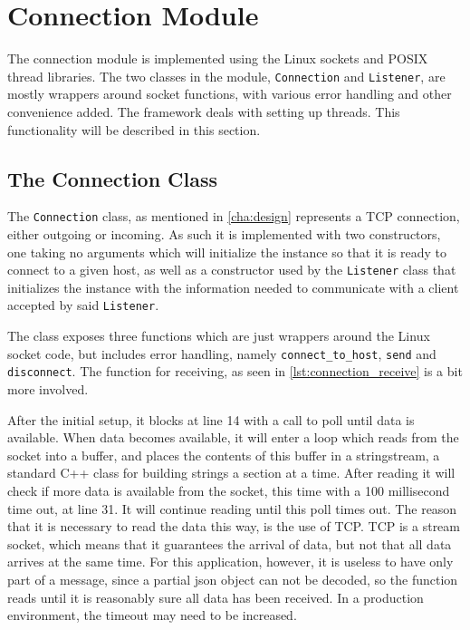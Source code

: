\section{Connection Module}

The connection module is implemented using the Linux sockets and POSIX thread libraries. The two classes in the module, \lstinline|Connection| and \lstinline|Listener|, are mostly wrappers around socket functions,
with various error handling and other convenience added. The framework deals with setting up threads. This functionality will be described in this section.

\subsection{The Connection Class}

The \lstinline|Connection| class, as mentioned in \autoref{cha:design} represents a TCP connection, either outgoing or incoming. As such it is implemented with two constructors,
one taking no arguments which will initialize the instance so that it is ready to connect to a given host, as well as a constructor used by the \lstinline|Listener| class that initializes the instance
with the information needed to communicate with a client accepted by said \lstinline|Listener|.

The class exposes three functions which are just wrappers around the Linux socket code, but includes error handling, namely \lstinline|connect_to_host|, \lstinline|send| and \lstinline|disconnect|. The function for receiving,
as seen in \autoref{lst:connection_receive} is a bit more involved.

After the initial setup, it blocks at line 14 with a call to poll until data is available. When data becomes available,
it will enter a loop which reads from the socket into a buffer, and places the contents of this buffer in a stringstream, a standard C++ class for building strings a section at a time.
After reading it will check if more data is available from the socket, this time with a 100 millisecond time out, at line 31. It will continue reading until this poll times out. The reason
that it is necessary to read the data this way, is the use of TCP. TCP is a stream socket, which means that it guarantees the arrival of data, but not that all data arrives at the same time.
For this application, however, it is useless to have only part of a message, since a partial \ac{json} object can not be decoded, so the function reads until it is reasonably sure all data
has been received. In a production environment, the timeout may need to be increased.

